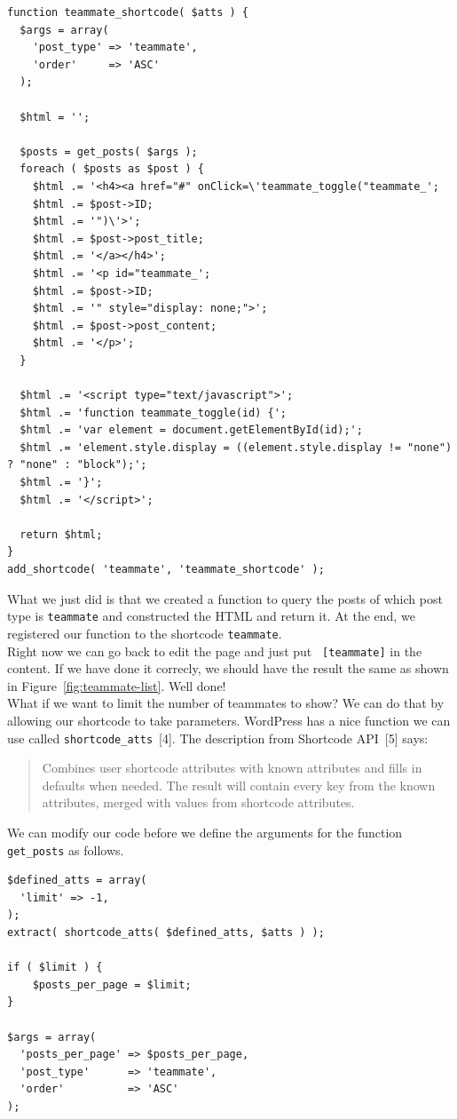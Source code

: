 \documentclass{article}
\begin{document}
\begin{verbatim}
function teammate_shortcode( $atts ) {
  $args = array(
    'post_type' => 'teammate',
    'order'     => 'ASC'
  );

  $html = '';

  $posts = get_posts( $args );
  foreach ( $posts as $post ) {
    $html .= '<h4><a href="#" onClick=\'teammate_toggle("teammate_';
    $html .= $post->ID;
    $html .= '")\'>';
    $html .= $post->post_title;
    $html .= '</a></h4>';
    $html .= '<p id="teammate_';
    $html .= $post->ID;
    $html .= '" style="display: none;">';
    $html .= $post->post_content;
    $html .= '</p>';
  }

  $html .= '<script type="text/javascript">';
  $html .= 'function teammate_toggle(id) {';
  $html .= 'var element = document.getElementById(id);';
  $html .= 'element.style.display = ((element.style.display != "none") ? "none" : "block");';
  $html .= '}';
  $html .= '</script>';

  return $html;
}
add_shortcode( 'teammate', 'teammate_shortcode' );
\end{verbatim}

\noindent What we just did is that we created a function to query the posts of
which post type is {\tt teammate} and constructed the HTML and return it. At
the end, we registered our function to the shortcode {\tt teammate}. \\

\noindent Right now we can go back to edit the page and just put {\tt
[teammate]} in the content. If we have done it correcly, we should have the
result the same as shown in Figure~\ref{fig:teammate-list}. Well done! \\

\noindent What if we want to limit the number of teammates to show? We can do
that by allowing our shortcode to take parameters. WordPress has a nice
function we can use called {\tt shortcode\_atts}~[4]. The description from
Shortcode API~[5] says:

\begin{quote}
Combines user shortcode attributes with known attributes and fills in defaults
when needed. The result will contain every key from the known attributes,
merged with values from shortcode attributes.
\end{quote}

\noindent We can modify our code before we define the arguments for the
function {\tt get\_posts} as follows.

\begin{verbatim}
$defined_atts = array(
  'limit' => -1,
);
extract( shortcode_atts( $defined_atts, $atts ) );

if ( $limit ) {
    $posts_per_page = $limit;
}

$args = array(
  'posts_per_page' => $posts_per_page,
  'post_type'      => 'teammate',
  'order'          => 'ASC'
);
\end{verbatim}
\end{document}
